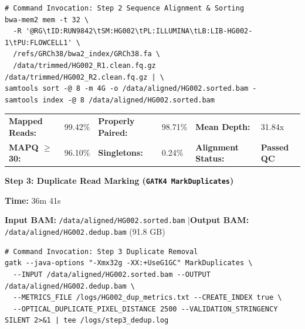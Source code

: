 \documentclass[10pt,a4paper]{article}
\newcommand{\badge}[2]{%
  \tcbox[on line, arc=3pt, colback=#1, colframe=#1, boxrule=0pt, top=1.5pt, bottom=1.5pt, left=5pt, right=5pt]{%
    \scriptsize\bfseries #2%
  }%
}
\begin{document}
\vspace{3pt}

\begin{tcolorbox}[codebox]
\begin{lstlisting}[style=bashstyle]
# Command Invocation: Step 2 Sequence Alignment & Sorting
bwa-mem2 mem -t 32 \
  -R '@RG\tID:RUN9842\tSM:HG002\tPL:ILLUMINA\tLB:LIB-HG002-1\tPU:FLOWCELL1' \
  /refs/GRCh38/bwa2_index/GRCh38.fa \
  /data/trimmed/HG002_R1.clean.fq.gz /data/trimmed/HG002_R2.clean.fq.gz | \
samtools sort -@ 8 -m 4G -o /data/aligned/HG002.sorted.bam -
samtools index -@ 8 /data/aligned/HG002.sorted.bam
\end{lstlisting}
\end{tcolorbox}

\begin{tcolorbox}[cardstyle, title={\scriptsize\color{NavyDark}\bfseries Alignment Quality Metrics (\texttt{samtools flagstat})}]
  \scriptsize
  \begin{tabularx}{\textwidth}{@{} >{\bfseries}l X >{\bfseries}l X >{\bfseries}l X @{}}
    Mapped Reads: & 99.42\% & Properly Paired: & 98.71\% & Mean Depth: & 31.84x \\
    MAPQ $\ge$ 30: & 96.10\% & Singletons: & 0.24\% & Alignment Status: & \textcolor{StatusGreen}{\textbf{Passed QC}} \\
  \end{tabularx}
\end{tcolorbox}

\vspace{8pt}

\noindent
\begin{minipage}[t]{0.70\textwidth}
  \normalsize\bfseries\color{NavyDark} Step 3: Duplicate Read Marking (\texttt{GATK4 MarkDuplicates})
\end{minipage}%
\hfill
\begin{minipage}[t]{0.28\textwidth}
  \raggedleft
  \badge{StatusGreenBg}{\color{StatusGreen}\faCheck~\,PASS} \quad
  \scriptsize\textbf{Time:} 36m 41s
\end{minipage}

\vspace{2pt}
{\scriptsize\textbf{Input BAM:} \texttt{/data/aligned/HG002.sorted.bam} \quad|\quad \textbf{Output BAM:} \texttt{/data/aligned/HG002.dedup.bam} (91.8 GB)}

\vspace{3pt}

\begin{tcolorbox}[codebox]
\begin{lstlisting}[style=bashstyle]
# Command Invocation: Step 3 Duplicate Removal
gatk --java-options "-Xmx32g -XX:+UseG1GC" MarkDuplicates \
  --INPUT /data/aligned/HG002.sorted.bam --OUTPUT /data/aligned/HG002.dedup.bam \
  --METRICS_FILE /logs/HG002_dup_metrics.txt --CREATE_INDEX true \
  --OPTICAL_DUPLICATE_PIXEL_DISTANCE 2500 --VALIDATION_STRINGENCY SILENT 2>&1 | tee /logs/step3_dedup.log
\end{lstlisting}
\end{tcolorbox}
\end{document}
